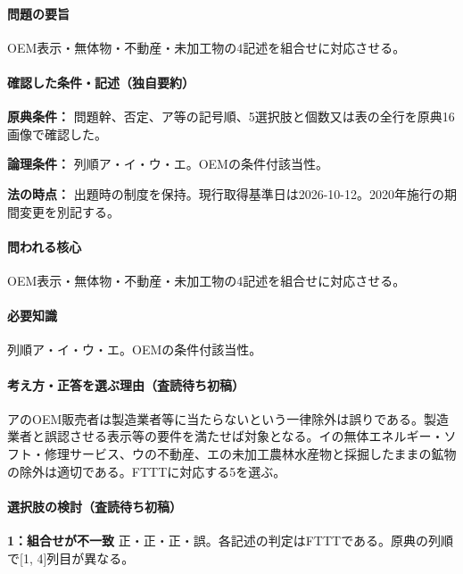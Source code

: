 \paragraph{問題の要旨} OEM表示・無体物・不動産・未加工物の4記述を組合せに対応させる。

\paragraph{確認した条件・記述（独自要約）}\mbox{}\par

\noindent\textbf{原典条件：} 問題幹、否定、ア等の記号順、5選択肢と個数又は表の全行を原典16画像で確認した。\par

\noindent\textbf{論理条件：} 列順ア・イ・ウ・エ。OEMの条件付該当性。\par

\noindent\textbf{法の時点：} 出題時の制度を保持。現行取得基準日は2026-10-12。2020年施行の期間変更を別記する。\par

\paragraph{問われる核心} OEM表示・無体物・不動産・未加工物の4記述を組合せに対応させる。

\paragraph{必要知識} 列順ア・イ・ウ・エ。OEMの条件付該当性。

\paragraph{考え方・正答を選ぶ理由（査読待ち初稿）} アのOEM販売者は製造業者等に当たらないという一律除外は誤りである。製造業者と誤認させる表示等の要件を満たせば対象となる。イの無体エネルギー・ソフト・修理サービス、ウの不動産、エの未加工農林水産物と採掘したままの鉱物の除外は適切である。FTTTに対応する5を選ぶ。

\paragraph{選択肢の検討（査読待ち初稿）}\mbox{}\par

\noindent\textbf{1：組合せが不一致} 正・正・正・誤。各記述の判定はFTTTである。原典の列順で[1, 4]列目が異なる。\par

